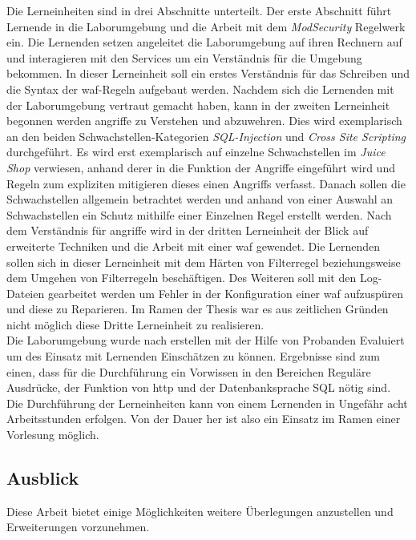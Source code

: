 Die Lerneinheiten sind in drei Abschnitte unterteilt.
Der erste Abschnitt führt Lernende in die Laborumgebung und die Arbeit mit dem \textit{ModSecurity} Regelwerk ein.
Die Lernenden setzen angeleitet die Laborumgebung auf ihren Rechnern auf und interagieren mit den Services um ein Verständnis für die Umgebung bekommen.
In dieser Lerneinheit soll ein erstes Verständnis für das Schreiben und die Syntax der \ac{waf}-Regeln aufgebaut werden.
Nachdem sich die Lernenden mit der Laborumgebung vertraut gemacht haben, kann in der zweiten Lerneinheit begonnen werden angriffe zu Verstehen und abzuwehren.
Dies wird exemplarisch an den beiden Schwachstellen-Kategorien \textit{SQL-Injection} und \textit{Cross Site Scripting} durchgeführt.
Es wird erst exemplarisch auf einzelne Schwachstellen im \textit{Juice Shop} verwiesen, anhand derer in die Funktion der Angriffe eingeführt wird und Regeln zum expliziten mitigieren dieses einen Angriffs verfasst.
Danach sollen die Schwachstellen allgemein betrachtet werden und anhand von einer Auswahl an Schwachstellen ein Schutz mithilfe einer Einzelnen Regel erstellt werden.
Nach dem Verständnis für angriffe wird in der dritten Lerneinheit der Blick auf erweiterte Techniken und die Arbeit mit einer \ac{waf} gewendet.
Die Lernenden sollen sich in dieser Lerneinheit mit dem Härten von Filterregel beziehungsweise dem Umgehen von Filterregeln beschäftigen.
Des Weiteren soll mit den Log-Dateien gearbeitet werden um Fehler in der Konfiguration einer \ac{waf} aufzuspüren und diese zu Reparieren.
Im Ramen der Thesis war es aus zeitlichen Gründen nicht möglich diese Dritte Lerneinheit zu realisieren.\\

Die Laborumgebung wurde nach erstellen mit der Hilfe von Probanden Evaluiert um des Einsatz mit Lernenden Einschätzen zu können.
Ergebnisse sind zum einen, dass für die Durchführung ein Vorwissen in den Bereichen Reguläre Ausdrücke, der Funktion von \ac{http} und der Datenbanksprache SQL nötig sind.
Die Durchführung der Lerneinheiten kann von einem Lernenden in Ungefähr acht Arbeitsstunden erfolgen.
Von der Dauer her ist also ein Einsatz im Ramen einer Vorlesung möglich.

\subsection{Ausblick}

Diese Arbeit bietet einige Möglichkeiten weitere Überlegungen anzustellen und Erweiterungen vorzunehmen.


